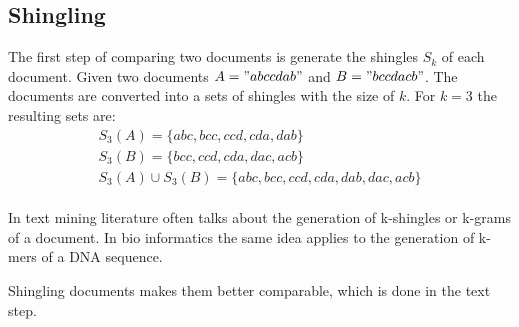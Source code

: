 \subsection{Shingling}

The first step of comparing two documents is generate the shingles $ S_k $ of each document. Given two documents $ A = "abccdab" $ and $ B = "bccdacb" $. The documents are  converted into a sets of shingles with the size of $ k $. For $ k = 3 $ the resulting sets are: \\

\begin{equation}
    \begin{split}
        S_3(A) = \{abc, bcc, ccd, cda, dab\} \\
        S_3(B) = \{bcc, ccd, cda, dac, acb\} \\
        S_3(A) \cup S_3(B) = \{abc, bcc, ccd, cda, dab, dac, acb\}
    \end{split}
\end{equation}\\

In text mining literature often talks about the generation of k-shingles or k-grams of a document. In bio informatics the same idea applies to the generation of k-mers of a DNA sequence.

Shingling documents makes them better comparable, which is done in the text step.